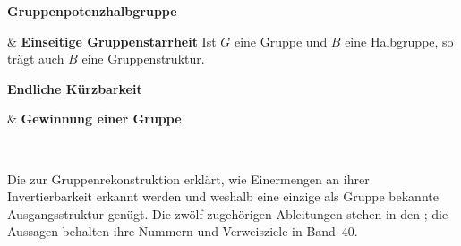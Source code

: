 \begin{BandUebersicht}
\textbf{Gruppenpotenzhalbgruppe}

&
\textbf{Einseitige Gruppenstarrheit}
Ist \(G\) eine Gruppe und \(B\) eine Halbgruppe, so trägt auch \(B\) eine Gruppenstruktur.
 \\
\addlinespace[.8ex]

\textbf{Endliche Kürzbarkeit}

&
\textbf{Gewinnung einer Gruppe}

 \\
\addlinespace[.8ex]
\end{BandUebersicht}

\medskip\noindent
Die \ReconstructionReadingLink{} zur Gruppenrekonstruktion erklärt,
wie Einermengen an ihrer Invertierbarkeit erkannt werden und weshalb
eine einzige als Gruppe bekannte Ausgangsstruktur genügt.
Die zwölf zugehörigen Ableitungen stehen in den \ReconstructionProofsLink{};
die Aussagen behalten ihre Nummern und Verweisziele in Band~40.
